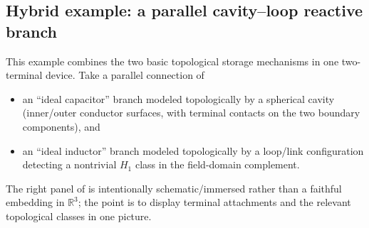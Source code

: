 \documentclass[11pt]{article}
\begin{document}
\subsection{Hybrid example: a parallel cavity--loop reactive branch}
\label{sec:hybrid-parallel-lc}
This example combines the two basic topological storage mechanisms in one two-terminal device.
Take a parallel connection of
\begin{itemize}
  \item an ``ideal capacitor'' branch modeled topologically by a spherical cavity (inner/outer conductor surfaces, with terminal contacts on the two boundary components), and
  \item an ``ideal inductor'' branch modeled topologically by a loop/link configuration detecting a nontrivial $H_1$ class in the field-domain complement.
\end{itemize}
The right panel of  is intentionally schematic/immersed rather than a faithful embedding in $\mathbb{R}^3$; the point is to display terminal attachments and the relevant topological classes in one picture.
\end{document}
